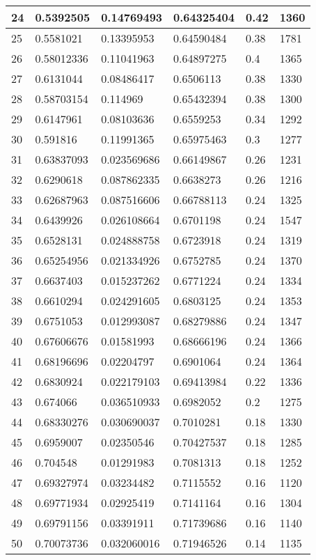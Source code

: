 \begin{longtable}{|l|l|l|l|l|l|}
24 & 0.5392505 & 0.14769493 & 0.64325404 & 0.42 & 1360 \\ \hline 
25 & 0.5581021 & 0.13395953 & 0.64590484 & 0.38 & 1781 \\ \hline 
26 & 0.58012336 & 0.11041963 & 0.64897275 & 0.4 & 1365 \\ \hline 
27 & 0.6131044 & 0.08486417 & 0.6506113 & 0.38 & 1330 \\ \hline 
28 & 0.58703154 & 0.114969 & 0.65432394 & 0.38 & 1300 \\ \hline 
29 & 0.6147961 & 0.08103636 & 0.6559253 & 0.34 & 1292 \\ \hline 
30 & 0.591816 & 0.11991365 & 0.65975463 & 0.3 & 1277 \\ \hline 
31 & 0.63837093 & 0.023569686 & 0.66149867 & 0.26 & 1231 \\ \hline 
32 & 0.6290618 & 0.087862335 & 0.6638273 & 0.26 & 1216 \\ \hline 
33 & 0.62687963 & 0.087516606 & 0.66788113 & 0.24 & 1325 \\ \hline 
34 & 0.6439926 & 0.026108664 & 0.6701198 & 0.24 & 1547 \\ \hline 
35 & 0.6528131 & 0.024888758 & 0.6723918 & 0.24 & 1319 \\ \hline 
36 & 0.65254956 & 0.021334926 & 0.6752785 & 0.24 & 1370 \\ \hline 
37 & 0.6637403 & 0.015237262 & 0.6771224 & 0.24 & 1334 \\ \hline 
38 & 0.6610294 & 0.024291605 & 0.6803125 & 0.24 & 1353 \\ \hline 
39 & 0.6751053 & 0.012993087 & 0.68279886 & 0.24 & 1347 \\ \hline 
40 & 0.67606676 & 0.01581993 & 0.68666196 & 0.24 & 1366 \\ \hline 
41 & 0.68196696 & 0.02204797 & 0.6901064 & 0.24 & 1364 \\ \hline 
42 & 0.6830924 & 0.022179103 & 0.69413984 & 0.22 & 1336 \\ \hline 
43 & 0.674066 & 0.036510933 & 0.6982052 & 0.2 & 1275 \\ \hline 
44 & 0.68330276 & 0.030690037 & 0.7010281 & 0.18 & 1330 \\ \hline 
45 & 0.6959007 & 0.02350546 & 0.70427537 & 0.18 & 1285 \\ \hline 
46 & 0.704548 & 0.01291983 & 0.7081313 & 0.18 & 1252 \\ \hline 
47 & 0.69327974 & 0.03234482 & 0.7115552 & 0.16 & 1120 \\ \hline 
48 & 0.69771934 & 0.02925419 & 0.7141164 & 0.16 & 1304 \\ \hline 
49 & 0.69791156 & 0.03391911 & 0.71739686 & 0.16 & 1140 \\ \hline 
50 & 0.70073736 & 0.032060016 & 0.71946526 & 0.14 & 1135 \\ \hline 
\end{longtable}